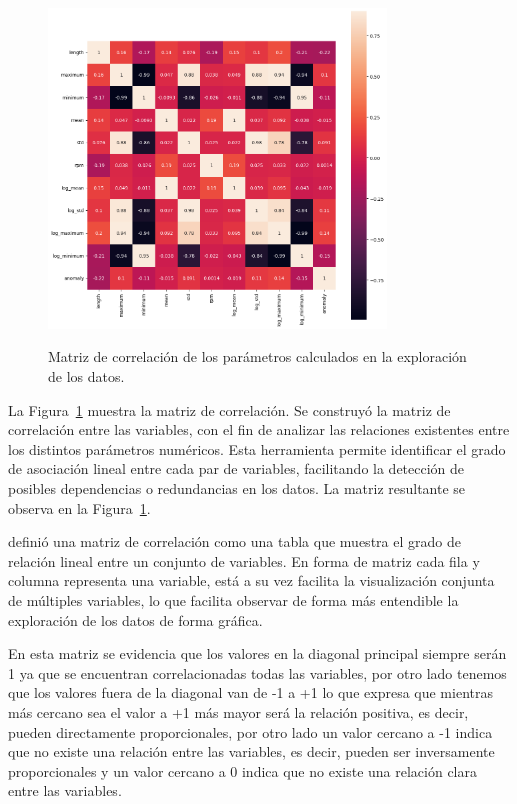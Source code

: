 \documentclass[11pt,a4paper,spanish]{book}
\numberwithin{equation}{chapter}
\numberwithin{figure}{chapter}
\begin{document}
\begin{figure}[H]
    \caption{Matriz de correlación de los parámetros calculados en la exploración de los datos. }
    \centering
    \includegraphics[width=0.8\textwidth]{media/dataset/corr-mat.png}
    \label{fig:figCorrMat}
\end{figure}


La Figura~\ref{fig:figCorrMat} muestra la matriz de correlación. Se
construyó la matriz de correlación entre las variables, con el fin de
analizar las relaciones existentes entre los distintos parámetros numéricos. 
Esta herramienta permite 
identificar el grado de asociación lineal entre cada par de variables, facilitando la 
detección de posibles dependencias o redundancias en los datos. La matriz resultante se 
observa en la Figura~\ref{fig:figCorrMat}. 


\cite{Alvarez2023} definió una matriz de correlación como una tabla que muestra el grado 
de relación lineal entre un conjunto de variables. En forma de matriz cada fila y 
columna representa una variable, está a su vez facilita la visualización conjunta de 
múltiples variables, lo que facilita observar de forma más entendible la exploración de 
los datos de forma gráfica.


En esta matriz se evidencia que los valores en la diagonal principal siempre serán 1 ya 
que se encuentran correlacionadas todas las variables, por otro lado tenemos que los 
valores fuera de la diagonal van de -1 a +1 lo que expresa que mientras más cercano sea 
el valor a +1 más mayor será la relación positiva, es decir, pueden directamente 
proporcionales, por otro lado un valor cercano a -1 indica que no existe una relación 
entre las variables, es decir, pueden ser inversamente proporcionales y un valor cercano 
a 0 indica que no existe una relación clara entre las variables. \cite{Alvarez2023}
\end{document}
